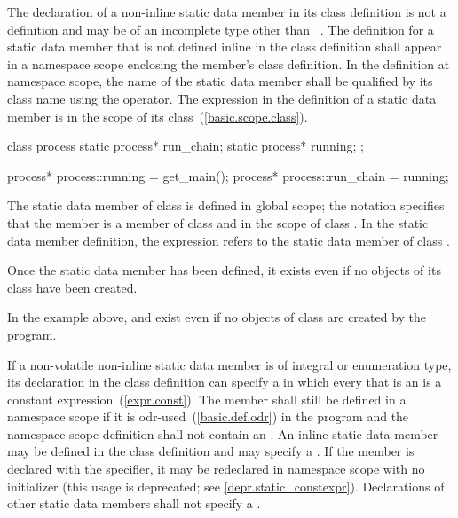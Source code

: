 \pnum
{}%
%
The declaration of a non-inline
static data member in its class definition
is not a definition and may be of an incomplete type other than
\cv{}~. The definition for a static data
member that is not defined inline in the class definition
shall appear in a namespace scope enclosing the member's class
definition.
%
In the definition at namespace scope, the name of the static
data member shall be qualified by its class name using the \tcode{::}
operator. The  expression in the definition of a
static data member is in the scope of its
class~(\ref{basic.scope.class}).
%
\begin{example}

\begin{codeblock}
class process {
  static process* run_chain;
  static process* running;
};

process* process::running = get_main();
process* process::run_chain = running;
\end{codeblock}

The static data member  of class
 is defined in global scope; the notation
 specifies that the member 
is a member of class  and in the scope of class
. In the static data member definition, the
 expression refers to the static data
member  of class .
\end{example}

\begin{note}
Once the static data member has been defined, it exists even if
no objects of its class have been created.
\begin{example}
In the example above,  and  exist even
if no objects of class  are created by the program.
\end{example}
\end{note}

\pnum
If a non-volatile non-inline  static data member is
of integral or enumeration type,
its declaration in the class definition can specify a
 in which every
 that is an 
is a constant expression~(\ref{expr.const}).
The member shall still be defined in a namespace scope if
it is odr-used~(\ref{basic.def.odr}) in the program and the
namespace scope definition shall not contain an .
An inline static data member may be defined in the class definition
and may specify a . If the
member is declared with the  specifier, it may be
redeclared in namespace scope with no initializer (this usage is
deprecated; see \ref{depr.static_constexpr}). Declarations of other
static data members shall not specify a .

